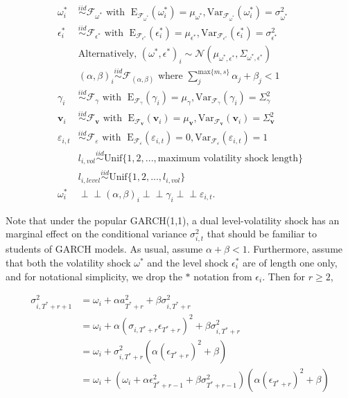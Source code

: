 \documentclass[11pt]{article}
\newcommand{\simiid}{\stackrel{iid}{\sim}} %
\newcommand{\indep}{\perp \!\!\! \perp } %
\def\mrm#1{\mathrm{#1}} %
\def\mc#1{\mathcal{#1}} %
\def\mc#1{\mathcal{#1}}
\theoremstyle{definition}
\begin{document}
\begin{align*}
\omega^{*}_i &\simiid \mc{F}_{\omega^{*}} \text{ with }  \; \mrm{E}_{\mc{F}_{\omega^{*}}}(\omega^{*}_i) = \mu_{\omega^{*}}, \mrm{Var}_{\mc{F}_{\omega^{*}}}(\omega^{*}_i)  = \sigma^2_{\omega^{*}}  \\
\epsilon^{*}_i &\simiid \mc{F}_{\epsilon^{*}} \text{ with }  \; \mrm{E}_{\mc{F}_{\epsilon^{*}}}(\epsilon^{*}_i) = \mu_{\epsilon^{*}}, \mrm{Var}_{\mc{F}_{\epsilon^{*}}}(\epsilon^{*}_i)  = \sigma^2_{\epsilon^{*}}  \\
& \text{Alternatively, } (\omega^{*}, \epsilon^{*})_{i} \sim \mathcal{N}(\mu_{\omega^{*},\epsilon^{*}}, \Sigma_{\omega^{*},\epsilon^{*}}) \\
&(\alpha, \beta)_i \simiid \mc{F}_{(\alpha, \beta)} \text{ where } \sum^{ \text{max} \{m,s \} }_{j}\alpha_j + \beta_j < 1 \\
   \gamma_i &\simiid \mc{F}_{\gamma} \text{ with }  \; \mrm{E}_{\mc{F}_{\gamma}}(\gamma_i) = \mu_{\gamma}, \mrm{Var}_{\mc{F}_{\gamma}}(\gamma_i)  = \Sigma^2_{\gamma} \\
   \mathbf{v}_i &\simiid \mc{F}_{\mathbf{v}} \text{ with }  \; \mrm{E}_{\mc{F}_{\mathbf{v}}}(\mathbf{v}_i) = \mu_{\mathbf{v}}, \mrm{Var}_{\mc{F}_{\mathbf{v}}}(\mathbf{v}_i)  = \Sigma^2_{\mathbf{v}} \\
\varepsilon_{i,t} & \simiid  \mc{F}_{\varepsilon} \text{ with }  \; \mrm{E}_{\mc{F}_{\varepsilon}}(\varepsilon_{i,t}) = 0, \mrm{Var}_{\mc{F}_{\varepsilon}}(\varepsilon_{i,t})  = 1 \\
&l_{i,vol} \simiid \text{Unif}\{1,2,...,\text{maximum volatility shock length}\}\\
&l_{i, level} \simiid \text{Unif}\{1,2,...,l_{i,vol}\}\\
\omega^{*}_i &\indep  (\alpha, \beta)_i \indep \gamma_i \indep \varepsilon_{i,t}.
\end{align*}


Note that under the popular GARCH(1,1), a dual level-volatility shock has an marginal effect on the conditional variance $\sigma^{2}_{i,t}$ that should be familiar to students of GARCH models.  As usual, assume $\alpha+\beta < 1$.  Furthermore, assume that both the volatility shock $\omega^{*}$ and the level shock $\epsilon^{*}_{i}$ are of length one only, and for notational simplicity, we drop the $*$ notation from $\epsilon_{i}$.  Then for $r\geq 2$,

\begin{align}
\sigma^{2}_{i,T^{*}+r+1} & = \omega_{i} + \alpha a_{T^{*}+r}^{2} + \beta\sigma^{2}_{i,T^{*}+r} \\
& = \omega_{i} + \alpha(\sigma_{i,T^{*}+r}\epsilon_{T^{*}+r})^{2} + \beta\sigma^{2}_{i,T^{*}+r} \\
& = \omega_{i} + \sigma^{2}_{i,T^{*}+r}(\alpha (\epsilon_{T^{*}+r})^{2} + \beta)\\
& = \omega_{i} + (\omega_{i} + \alpha\epsilon_{T^{*}+r-1}^{2} +\beta\sigma^{2}_{T^{*}+r-1})(\alpha (\epsilon_{T^{*}+r})^{2} + \beta)
\end{align}
\end{document}

